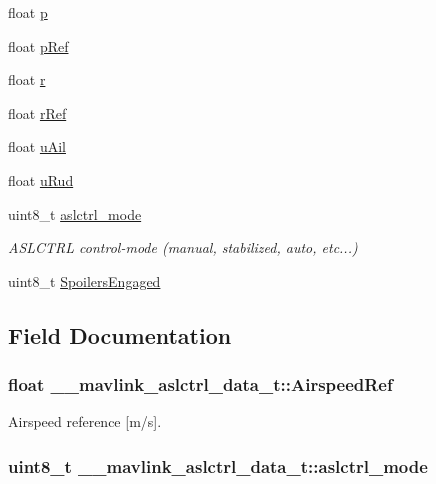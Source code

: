 \begin{DoxyCompactItemize}
float \hyperlink{struct____mavlink__aslctrl__data__t_afa70b614364f078d7ab039891f53ae63}{p}
\item 
float \hyperlink{struct____mavlink__aslctrl__data__t_acf6a3548b76c31e11d6e3a8635f6a390}{p\+Ref}
\item 
float \hyperlink{struct____mavlink__aslctrl__data__t_aea601cf373338bd47446607f6f7bf0bb}{r}
\item 
float \hyperlink{struct____mavlink__aslctrl__data__t_a8111887ae8f3cfc3a6aace8bc4e6d9aa}{r\+Ref}
\item 
float \hyperlink{struct____mavlink__aslctrl__data__t_a5c7789b41b0d0d09750094ad3c91c675}{u\+Ail}
\item 
float \hyperlink{struct____mavlink__aslctrl__data__t_a0188ad1c5127a00f73e648019dbf2f57}{u\+Rud}
\item 
uint8\+\_\+t \hyperlink{struct____mavlink__aslctrl__data__t_ad8adad4161e89ca10a9a8fcee44777fb}{aslctrl\+\_\+mode}
\begin{DoxyCompactList}\small\item\em A\+S\+L\+C\+T\+R\+L control-\/mode (manual, stabilized, auto, etc...) \end{DoxyCompactList}\item 
uint8\+\_\+t \hyperlink{struct____mavlink__aslctrl__data__t_a4217cefa9be8872c7255628862683b9a}{Spoilers\+Engaged}
\end{DoxyCompactItemize}


\subsection{Field Documentation}
\hypertarget{struct____mavlink__aslctrl__data__t_a38893cda3ac10629d58aa857727d54a4}{
\subsubsection[{Airspeed\+Ref}]{\setlength{\rightskip}{0pt plus 5cm}float \+\_\+\+\_\+mavlink\+\_\+aslctrl\+\_\+data\+\_\+t\+::\+Airspeed\+Ref}}\label{struct____mavlink__aslctrl__data__t_a38893cda3ac10629d58aa857727d54a4}


Airspeed reference \mbox{[}m/s\mbox{]}. 

\hypertarget{struct____mavlink__aslctrl__data__t_ad8adad4161e89ca10a9a8fcee44777fb}{
\subsubsection[{aslctrl\+\_\+mode}]{\setlength{\rightskip}{0pt plus 5cm}uint8\+\_\+t \+\_\+\+\_\+mavlink\+\_\+aslctrl\+\_\+data\+\_\+t\+::aslctrl\+\_\+mode}}\label{struct____mavlink__aslctrl__data__t_ad8adad4161e89ca10a9a8fcee44777fb}



